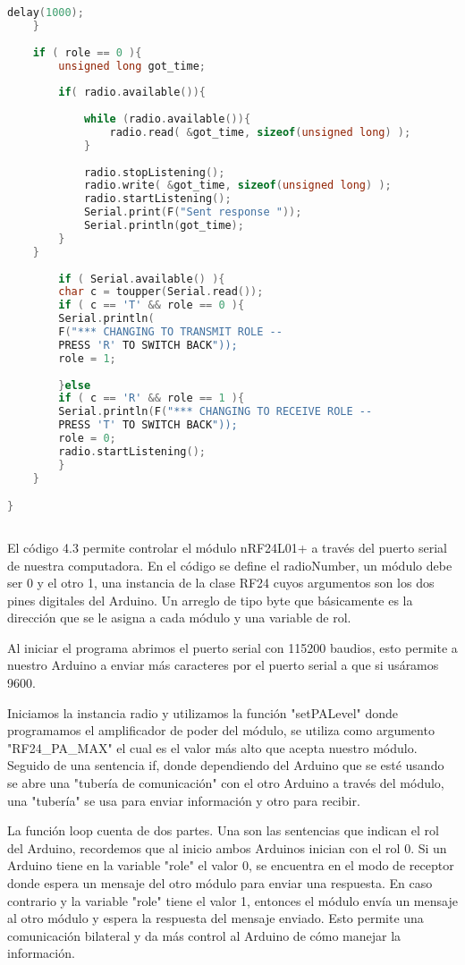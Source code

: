 \begin{lstlisting}[language=C++, caption={Codigo Ejemplo para módulo nRF24L01+}, captionpos=b]
		delay(1000);
	}
	
	if ( role == 0 ){
		unsigned long got_time;
		
		if( radio.available()){
		
			while (radio.available()){                                  
				radio.read( &got_time, sizeof(unsigned long) );            
			}
			
			radio.stopListening();                                       
			radio.write( &got_time, sizeof(unsigned long) );             
			radio.startListening();                                      
			Serial.print(F("Sent response "));
			Serial.println(got_time);
		}
	}
		
		if ( Serial.available() ){
		char c = toupper(Serial.read());
		if ( c == 'T' && role == 0 ){
		Serial.println(
		F("*** CHANGING TO TRANSMIT ROLE -- 
		PRESS 'R' TO SWITCH BACK"));
		role = 1;                 
		
		}else
		if ( c == 'R' && role == 1 ){
		Serial.println(F("*** CHANGING TO RECEIVE ROLE -- 
		PRESS 'T' TO SWITCH BACK"));
		role = 0;                
		radio.startListening();
		}
	}

} 
	
\end{lstlisting}

\par \noindent
El código 4.3 permite controlar el módulo nRF24L01+ a través del puerto serial de nuestra computadora. En el código se define el radioNumber, un módulo debe ser 0 y el otro 1, una instancia de la clase RF24 cuyos argumentos son los dos pines digitales del Arduino. Un arreglo de tipo byte que básicamente es la dirección que se le asigna a cada módulo y una variable de rol. 

\par \noindent
Al iniciar el programa abrimos el puerto serial con 115200 baudios, esto permite a nuestro Arduino a enviar más caracteres por el puerto serial a que si usáramos 9600. 

Iniciamos la instancia radio y utilizamos la función "setPALevel" donde programamos el amplificador de poder del módulo, se utiliza como argumento "RF24\_PA\_MAX" el cual es el valor más alto que acepta nuestro módulo. Seguido de una sentencia if, donde dependiendo del Arduino que se esté usando se abre una "tubería de comunicación" con el otro Arduino a través del módulo, una "tubería" se usa para enviar información y otro para recibir.

\par \noindent
La función loop cuenta de dos partes. Una son las sentencias que indican el rol del Arduino, recordemos que al inicio ambos Arduinos inician con el rol 0. Si un Arduino tiene en la variable "role" el valor 0, se encuentra en el modo de receptor donde espera un mensaje del otro módulo para enviar una respuesta. En caso contrario y la variable "role" tiene el valor 1, entonces el módulo envía un mensaje al otro módulo y espera la respuesta del mensaje enviado. Esto permite una comunicación bilateral y da más control al Arduino de cómo manejar la información.

